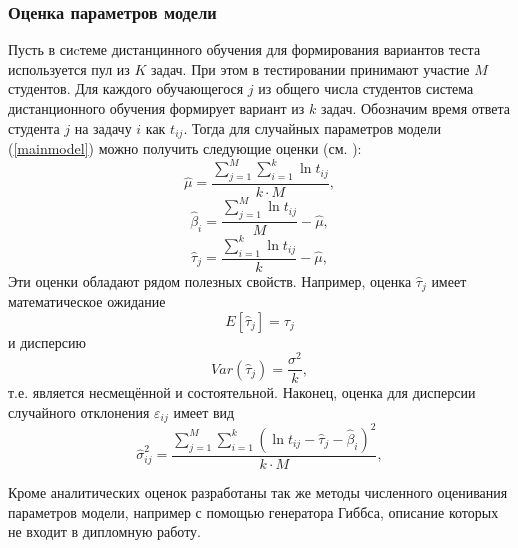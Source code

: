 \subsubsection{Оценка параметров модели}
\label{oppmpv}

Пусть в сиcтеме дистанцинного обучения для формирования вариантов теста используется пул из $K$ задач. При этом в тестировании принимают участие $M$ студентов. Для каждого обучающегося $j$ из общего числа студентов система дистанционного обучения формирует вариант из $k$ задач. Обозначим время ответа студента $j$ на задачу $i$ как $t_{ij}$. Тогда для случайных параметров модели (\ref{mainmodel}) можно по\-лучить следующие  оценки (см. \cite{2.,6.}):
\begin{equation}
\label{1166}
\hat{\mu} = \frac{\sum\limits_{j=1}^{M}\sum\limits_{i=1}^{k}\ln t_{ij}}{k \cdot M},
\end{equation}
\begin{equation}
\hat{\beta}_i = \frac{\sum\limits_{j=1}^{M}\ln t_{ij}}{M} - \hat{\mu},
\end{equation}
\begin{equation}
\hat{\tau}_j = \frac{\sum\limits_{i=1}^{k}\ln t_{ij}}{k} - \hat{\mu},
\end{equation}
Эти оценки обладают рядом полезных свойств. Например, оценка $\hat{\tau}_j$ имеет математическое ожидание
\begin{equation}
\label{exp}
E[\hat{\tau}_j] = \tau_j
\end{equation}
и дисперсию
\begin{equation}
\label{var}
Var(\hat{\tau}_j) = \frac{\sigma^2}{k},
\end{equation}
т.е. является несмещённой и состоятельной. Наконец, оценка для дисперсии случайного отклонения $\varepsilon_{ij}$ имеет вид
\begin{equation}
\label{1167}
\hat{\sigma}^{2}_{ij} = \frac{\sum\limits_{j=1}^{M}\sum\limits_{i=1}^{k}(\ln t_{ij} - \hat{\tau}_j - \hat{\beta}_i)^2}{k \cdot M},
\end{equation}

Кроме аналитических оценок разработаны так же методы численного оце\-нивания параметров модели, например с помощью генератора Гиббса\cite{3.}, описание которых не входит в дипломную работу.

